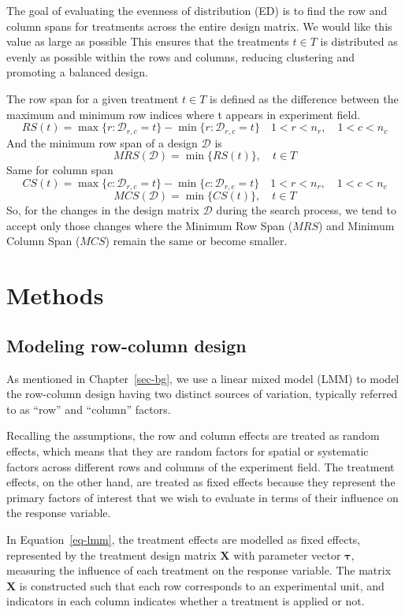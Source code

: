 \documentclass[
  a4paper,
  oneside,
  openany,
  12pt,
  onecolumn]{book}
\theoremstyle{definition}
\theoremstyle{definition}
\theoremstyle{plain}
\theoremstyle{remark}
\begin{document}
The goal of evaluating the evenness of distribution (ED) is to find the
row and column spans for treatments across the entire design matrix. We
would like this value as large as possible This ensures that the
treatments \(t\in T\) is distributed as evenly as possible within the
rows and columns, reducing clustering and promoting a balanced design.

The row span for a given treatment \(t \in T\) is defined as the
difference between the maximum and minimum row indices where t appears
in experiment field. \[
RS(t)=\max\{r:\mathcal{D}_{r,c}=t\}-\min\{r:\mathcal{D}_{r,c}=t\} \quad 1<r<n_r,\quad 1<c<n_c
\] And the minimum row span of a design \(\mathcal{D}\) is \[
MRS(\mathcal{D})=\min\{RS(t)\},\quad t \in T
\] Same for column span \[
CS(t)=\max\{c:\mathcal{D}_{r,c}=t\}-\min\{c:\mathcal{D}_{r,c}=t\} \quad 1<r<n_r,\quad 1<c<n_c
\] \[
MCS(\mathcal{D})=\min\{CS(t)\},\quad t \in T
\] So, for the changes in the design matrix \(\mathcal{D}\) during the
search process, we tend to accept only those changes where the Minimum
Row Span (\(MRS\)) and Minimum Column Span (\(MCS\)) remain the same or
become smaller.


\chapter{Methods}\label{sec-methods}

\section{Modeling row-column design}\label{modeling-row-column-design}

As mentioned in Chapter~\ref{sec-bg}, we use a linear mixed model (LMM)
to model the row-column design having two distinct sources of variation,
typically referred to as ``row'' and ``column'' factors.

Recalling the assumptions, the row and column effects are treated as
random effects, which means that they are random factors for spatial or
systematic factors across different rows and columns of the experiment
field. The treatment effects, on the other hand, are treated as fixed
effects because they represent the primary factors of interest that we
wish to evaluate in terms of their influence on the response variable.

In Equation~\ref{eq-lmm}, the treatment effects are modelled as fixed
effects, represented by the treatment design matrix \(\boldsymbol{X}\)
with parameter vector \(\boldsymbol{\tau}\), measuring the influence of
each treatment on the response variable. The matrix \(\boldsymbol{X}\)
is constructed such that each row corresponds to an experimental unit,
and indicators in each column indicates whether a treatment is applied
or not.
\end{document}
